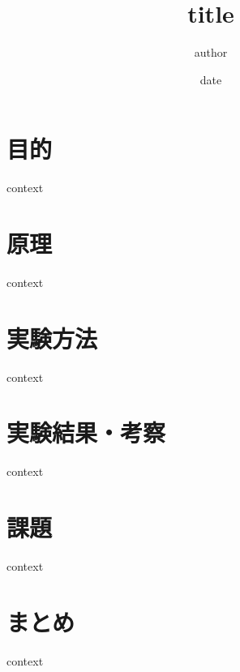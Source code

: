 \documentclass[a4paper,11pt,titlepage]{jsarticle}
\title{title}
\author{author}
\date{date}
\begin{document}
   \maketitle

   \section{目的}
   context

   \section{原理}
   context

   \section{実験方法}
   context

   \section{実験結果・考察}
   context

   \section{課題}
   context

   \section{まとめ}
   context
\end{document}
